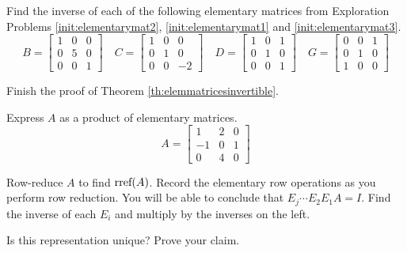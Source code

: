 \documentclass{ximera}
\begin{document}
\begin{problem}\label{prob:elem_mat_inv}
Find the inverse of each of the following elementary matrices from Exploration Problems \ref{init:elementarymat2}, \ref{init:elementarymat1} and \ref{init:elementarymat3}.
$$
 B = \begin{bmatrix}  
 1&0&0\\0&5&0\\0&0&1
 \end{bmatrix}\quad
 C = \begin{bmatrix}  
 1&0&0\\0&1&0\\0&0&-2
 \end{bmatrix}
 \quad
 D = \begin{bmatrix}  
 1&0&1\\0&1&0\\0&0&1
 \end{bmatrix}\quad 
 G =  \begin{bmatrix}  
 0&0&1\\0&1&0\\1&0&0
 \end{bmatrix}
 $$
\end{problem}

\begin{problem}
Finish the proof of Theorem \ref{th:elemmatricesinvertible}.
\end{problem}

\begin{problem}
Express $A$ as a product of elementary matrices.
$$A=\begin{bmatrix}1&2&0\\-1&0&1\\0&4&0\end{bmatrix}$$
\begin{hint}
Row-reduce $A$ to find $\textnormal{rref}(A)$.  Record the elementary row operations as you perform row reduction.  You will be able to conclude that $E_j\cdots E_2E_1A=I$.  Find the inverse of each $E_i$ and multiply by the inverses on the left.
\end{hint}
Is this representation unique?  Prove your claim.
\end{problem}
\end{document}
